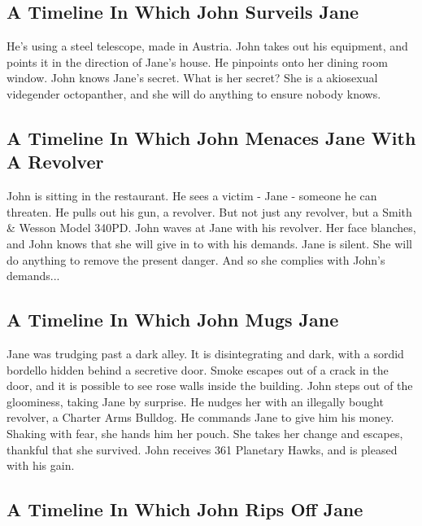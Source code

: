 \documentclass{article}
\begin{document}
\subsection{A Timeline In Which John Surveils Jane}


He's using a steel telescope, made in Austria.
John takes out his equipment, and points it in the direction of Jane's house. He pinpoints onto her dining room window.
John knows Jane's secret. What is her secret? She is a akiosexual videgender octopanther, and she will do anything to ensure nobody knows.
\subsection{A Timeline In Which John Menaces Jane With A Revolver}


John is sitting in the restaurant.
He sees a victim {-} Jane {-} someone he can threaten. He pulls out his gun, a revolver.
But not just any revolver, but a Smith \& Wesson Model 340PD.
John waves at Jane with his revolver. Her face blanches, and John knows that she will give in to with his demands.
Jane is silent. She will do anything to remove the present danger. And so she complies with John's demands...
\subsection{A Timeline In Which John Mugs Jane}


Jane was trudging past a dark alley.
It is disintegrating and dark, with a sordid bordello hidden behind a secretive door.
Smoke escapes out of a crack in the door, and it is possible to see rose walls inside the building.
John steps out of the gloominess, taking Jane by surprise.
He nudges her with an illegally bought revolver, a Charter Arms Bulldog.
He commands Jane to give him his money.
Shaking with fear, she hands him her pouch.
She takes her change and escapes, thankful that she survived.
John receives 361 Planetary Hawks, and is pleased with his gain.
\subsection{A Timeline In Which John Rips Off Jane}
\end{document}
